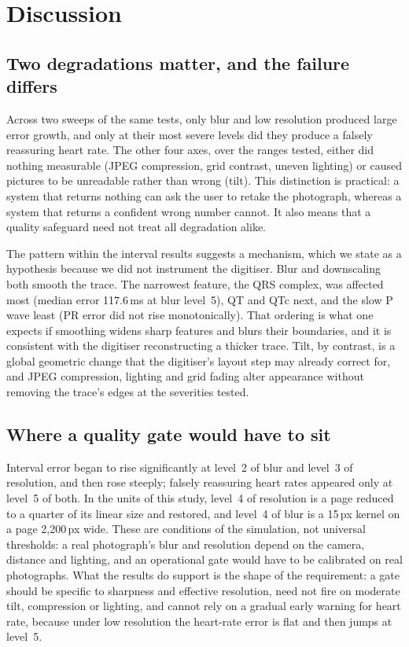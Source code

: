 \section{Discussion}\label{sec:discussion}

\subsection{Two degradations matter, and the failure differs}
Across two sweeps of the same tests, only blur and low resolution produced large error growth, and only at their most severe levels did they produce a falsely reassuring heart rate. The other four axes, over the ranges tested, either did nothing measurable (JPEG compression, grid contrast, uneven lighting) or caused pictures to be unreadable rather than wrong (tilt). This distinction is practical: a system that returns nothing can ask the user to retake the photograph, whereas a system that returns a confident wrong number cannot. It also means that a quality safeguard need not treat all degradation alike.

The pattern within the interval results suggests a mechanism, which we state as a hypothesis because we did not instrument the digitiser. Blur and downscaling both smooth the trace. The narrowest feature, the QRS complex, was affected most (median error 117.6\,ms at blur level~5), QT and QTc next, and the slow P wave least (PR error did not rise monotonically). That ordering is what one expects if smoothing widens sharp features and blurs their boundaries, and it is consistent with the digitiser reconstructing a thicker trace. Tilt, by contrast, is a global geometric change that the digitiser's layout step may already correct for, and JPEG compression, lighting and grid fading alter appearance without removing the trace's edges at the severities tested.

\subsection{Where a quality gate would have to sit}
Interval error began to rise significantly at level~2 of blur and level~3 of resolution, and then rose steeply; falsely reassuring heart rates appeared only at level~5 of both. In the units of this study, level~4 of resolution is a page reduced to a quarter of its linear size and restored, and level~4 of blur is a 15\,px kernel on a page 2{,}200\,px wide. These are conditions of the simulation, not universal thresholds: a real photograph's blur and resolution depend on the camera, distance and lighting, and an operational gate would have to be calibrated on real photographs. What the results do support is the shape of the requirement: a gate should be specific to sharpness and effective resolution, need not fire on moderate tilt, compression or lighting, and cannot rely on a gradual early warning for heart rate, because under low resolution the heart-rate error is flat and then jumps at level~5.

